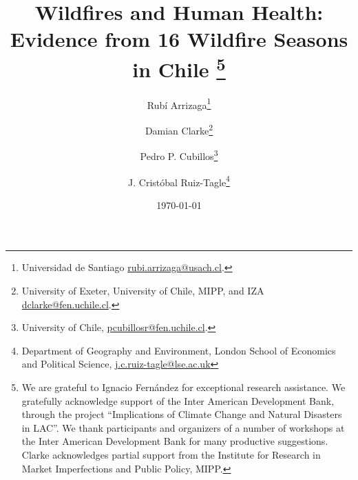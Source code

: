 \documentclass[11pt]{article}
\begin{document}
\title{\textbf{Wildfires and Human Health: Evidence from 16 Wildfire Seasons in Chile}
\thanks{We are grateful to Ignacio Fernández for exceptional research assistance. %
We gratefully acknowledge support of the Inter American Development Bank, through the project ``Implications of Climate Change and Natural Disasters in LAC''. We thank participants and organizers of a number of workshops at the Inter American Development Bank for many productive suggestions. Clarke acknowledges partial support from the Institute for Research in Market Imperfections and Public Policy, MIPP.}} %
\author{Rub\'i Arrizaga\thanks{Universidad de Santiago \href{mailto: rubi.arrizaga@usach.cl}{rubi.arrizaga@usach.cl}.}
  \and Damian Clarke\thanks{University of Exeter, University of Chile, MIPP, and IZA \href{mailto:dclarke@fen.uchile.cl}{dclarke@fen.uchile.cl}.}
    \and Pedro P. Cubillos\thanks{University of Chile, \href{mailto:pcubillosr@fen.uchile.cl}{pcubillosr@fen.uchile.cl}.}
\and J. Crist\'obal Ruiz-Tagle\thanks{Department of Geography and Environment, London School of Economics and Political Science, \href{mailto:j.c.ruiz-tagle@lse.ac.uk}{j.c.ruiz-tagle@lse.ac.uk}}}
\date{\today}

\renewcommand{\thefootnote}{\arabic{footnote}}
\setcounter{footnote}{0} 
\thispagestyle{empty}
\maketitle
\end{document}
